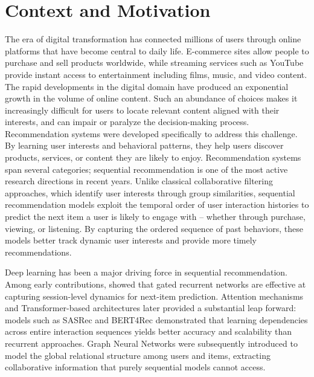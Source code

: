 \documentclass[12pt,a4paper]{report}
\begin{document}
\section*{Context and Motivation}

\justifying
The era of digital transformation has connected millions of users through
online platforms that have become central to daily life. E-commerce sites
allow people to purchase and sell products worldwide, while streaming
services such as YouTube provide instant access to entertainment including
films, music, and video content.
The rapid developments in the digital domain have produced an exponential
growth in the volume of online content. Such an abundance of choices makes
it increasingly difficult for users to locate relevant content aligned with
their interests, and can impair or paralyze the decision-making process.
Recommendation systems were developed specifically to address this challenge.
By learning user interests and behavioral patterns, they help users discover
products, services, or content they are likely to enjoy.
Recommendation systems span several categories; sequential recommendation
is one of the most active research directions in recent years. Unlike
classical collaborative filtering approaches, which identify user interests
through group similarities, sequential recommendation models exploit the
temporal order of user interaction histories to predict the next item a
user is likely to engage with -- whether through purchase, viewing, or
listening. By capturing the ordered sequence of past behaviors, these models
better track dynamic user interests and provide more timely recommendations.

Deep learning has been a major driving force in sequential recommendation.
Among early contributions, \citep{hidasi2016gru4rec} showed that gated
recurrent networks are effective at capturing session-level dynamics for
next-item prediction. Attention mechanisms and Transformer-based architectures
later provided a substantial leap forward: models such as SASRec
\citep{kang2018sasrec} and BERT4Rec \citep{sun2019bert4rec} demonstrated
that learning dependencies across entire interaction sequences yields better
accuracy and scalability than recurrent approaches.
Graph Neural Networks were subsequently introduced to model the global
relational structure among users and items, extracting collaborative
information that purely sequential models cannot access.
\end{document}
